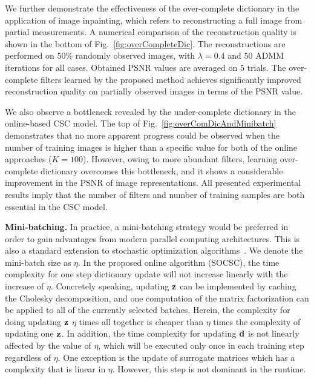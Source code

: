 We further demonstrate the effectiveness of the over-complete
dictionary in the application of image inpainting,
which refers to reconstructing a full image from partial
measurements. A numerical comparison of the reconstruction quality is
shown in the bottom of Fig.~\ref{fig:overCompleteDic}. The reconstructions
are performed on $50\%$ randomly observed images, with $\lambda = 0.4$ and
$50$ ADMM iterations for all cases. Obtained PSNR values are averaged on
5 trials. The over-complete filters learned by the proposed
method achieves significantly improved reconstruction quality on partially 
observed images in terms of the PSNR value.

We also observe a bottleneck revealed by the under-complete dictionary
in the online-based CSC model. The top of Fig.~\ref{fig:overComDicAndMinibatch} demonstrates that no more
apparent progress could be observed when the number of training images
is higher than a specific value for both of the online approaches
($K=100$). However, owing to more abundant filters, learning
over-complete dictionary overcomes this bottleneck, and it shows a
considerable improvement in the PSNR of image representations. All 
presented experimental results imply that the number of filters and 
number of training samples are both essential in the CSC model.

{\bfseries Mini-batching.} In practice, a mini-batching strategy would
be preferred in order to gain advantages from modern parallel
computing architectures. This is also a standard extension to
stochastic optimization algorithms~\cite{Takac2013, PCDM, SCSG}. We
denote the mini-batch size as $\eta$. In the proposed online algorithm
(SOCSC), the time complexity for one step dictionary update will not
increase linearly with the increase of $\eta$. Concretely speaking,
updating $\code$ can be implemented by caching the Cholesky
decomposition, and one computation of the matrix factorization can be
applied to all of the currently selected batches. Herein, the
complexity for doing updating $\code$ $\eta$ times all together is
cheaper than $\eta$ times the complexity of updating one $\code$. In
addition, the time complexity for updating $\filter$ is not linearly
affected by the value of $\eta$, which will be executed only once in
each training step regardless of $\eta$. One exception is the update
of surrogate matrices which has a complexity that is linear in
$\eta$. However, this step is not dominant in the runtime.

